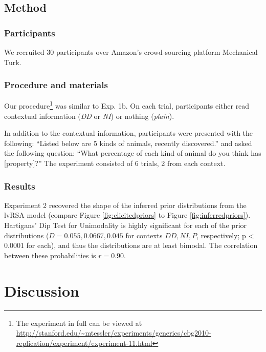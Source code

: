 \documentclass[10pt,letterpaper]{article}
\begin{document}
\subsection{Method}

\subsubsection{Participants}

We recruited 30 participants over Amazon's crowd-sourcing platform Mechanical Turk. 

\subsubsection{Procedure and materials}

Our procedure\footnote{The experiment in full can be viewed at \url{http://stanford.edu/~mtessler/experiments/generics/cbg2010-replication/experiment/experiment-11.html}} was similar to Exp. 1b. On each trial, participants either read contextual information (\emph{DD} or \emph{NI}) or nothing (\emph{plain}). 

In addition to the contextual information, participants were presented with the following: ``Listed below are 5 kinds of animals, recently discovered.'' and asked the following question: ``What percentage of each kind of animal do you think has [property]?'' The experiment consisted of 6 trials, 2 from each context. 

\subsubsection{Results}

Experiment 2 recovered the shape of the inferred prior distributions from the lvRSA model (compare Figure \ref{fig:elicitedpriors} to Figure \ref{fig:inferredpriors}). Hartigans' Dip Test for Unimodality is highly significant for each of the prior distributions ($D = 0.055, 0.0667, 0.045$ for contexts $DD, NI, P$, respectively; p < 0.0001 for each), and thus the distributions are at least bimodal. The correlation between these probabilities is $r = 0.90$.

\section{Discussion}
\end{document}
